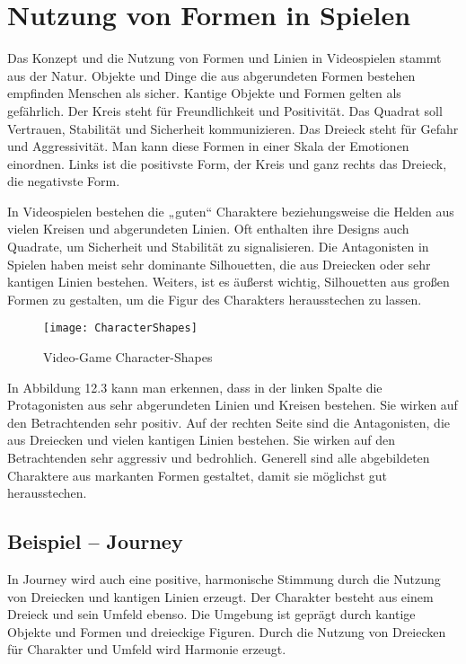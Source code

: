 \section{Nutzung von Formen in Spielen}
Das Konzept und die Nutzung von Formen und Linien in Videospielen stammt aus der Natur. Objekte und Dinge die aus abgerundeten Formen bestehen empfinden Menschen als sicher. Kantige Objekte und Formen gelten als gefährlich. Der Kreis steht für Freundlichkeit und Positivität. Das Quadrat soll Vertrauen, Stabilität und Sicherheit kommunizieren. Das Dreieck steht für Gefahr und Aggressivität. Man kann diese Formen in einer Skala der Emotionen einordnen. Links ist die positivste Form, der Kreis und ganz rechts das Dreieck, die negativste Form. 
\cite{_drawing_basics_and_video_game_art}

In Videospielen bestehen die „guten“ Charaktere beziehungsweise die Helden aus vielen Kreisen und abgerundeten Linien. Oft enthalten ihre Designs auch Quadrate, um Sicherheit und Stabilität zu signalisieren. Die Antagonisten in Spielen haben meist sehr dominante Silhouetten, die aus Dreiecken oder sehr kantigen Linien bestehen. Weiters, ist es äußerst wichtig, Silhouetten aus großen Formen zu gestalten, um die Figur des Charakters herausstechen zu lassen.
\cite{_drawing_basics_and_video_game_art}

\begin{figure}[H]
	\centering
	\texttt{[image: CharacterShapes]}
	\caption{Video-Game Character-Shapes\cite{_drawing_basics_and_video_game_art}}
\end{figure}

In Abbildung 12.3 kann man erkennen, dass in der linken Spalte die Protagonisten aus sehr abgerundeten Linien und Kreisen bestehen. Sie wirken auf den Betrachtenden sehr positiv. Auf der rechten Seite sind die Antagonisten, die aus Dreiecken und vielen kantigen Linien bestehen. Sie wirken auf den Betrachtenden sehr aggressiv und bedrohlich. Generell sind alle abgebildeten Charaktere aus markanten Formen gestaltet, damit sie möglichst gut herausstechen. 
\cite{_drawing_basics_and_video_game_art}

\subsection{Beispiel – Journey}
In Journey wird auch eine positive, harmonische Stimmung durch die Nutzung von Dreiecken und kantigen Linien erzeugt. Der Charakter besteht aus einem Dreieck und sein Umfeld ebenso. Die Umgebung ist geprägt durch kantige Objekte und Formen und dreieckige Figuren. Durch die Nutzung von Dreiecken für Charakter und Umfeld wird Harmonie erzeugt. 
\cite{_drawing_basics_and_video_game_art}

